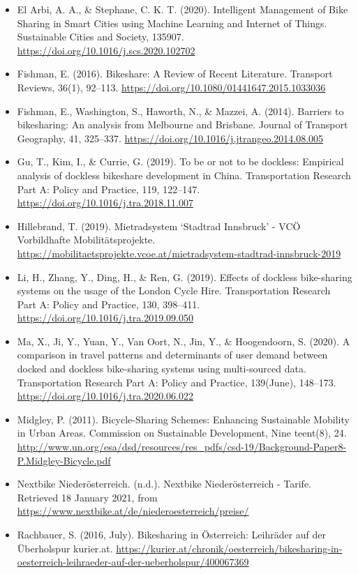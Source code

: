 \documentclass[
]{book}
\begin{document}
\begin{itemize}
\item
  El Arbi, A. A., \& Stephane, C. K. T. (2020). Intelligent Management of Bike Sharing in Smart Cities using Machine Learning and Internet of Things. Sustainable Cities and Society, 135907. \url{https://doi.org/10.1016/j.scs.2020.102702}
\item
  Fishman, E. (2016). Bikeshare: A Review of Recent Literature. Transport Reviews, 36(1), 92--113. \url{https://doi.org/10.1080/01441647.2015.1033036}
\item
  Fishman, E., Washington, S., Haworth, N., \& Mazzei, A. (2014). Barriers to bikesharing: An analysis from Melbourne and Brisbane. Journal of Transport Geography, 41, 325--337. \url{https://doi.org/10.1016/j.jtrangeo.2014.08.005}
\item
  Gu, T., Kim, I., \& Currie, G. (2019). To be or not to be dockless: Empirical analysis of dockless bikeshare development in China. Transportation Research Part A: Policy and Practice, 119, 122--147. \url{https://doi.org/10.1016/j.tra.2018.11.007}
\item
  Hillebrand, T. (2019). Mietradsystem `Stadtrad Innsbruck' - VCÖ Vorbildhafte Mobilitätsprojekte. \url{https://mobilitaetsprojekte.vcoe.at/mietradsystem-stadtrad-innsbruck-2019}
\item
  Li, H., Zhang, Y., Ding, H., \& Ren, G. (2019). Effects of dockless bike-sharing systems on the usage of the London Cycle Hire. Transportation Research Part A: Policy and Practice, 130, 398--411. \url{https://doi.org/10.1016/j.tra.2019.09.050}
\item
  Ma, X., Ji, Y., Yuan, Y., Van Oort, N., Jin, Y., \& Hoogendoorn, S. (2020). A comparison in travel patterns and determinants of user demand between docked and dockless bike-sharing systems using multi-sourced data. Transportation Research Part A: Policy and Practice, 139(June), 148--173. \url{https://doi.org/10.1016/j.tra.2020.06.022}
\item
  Midgley, P. (2011). Bicycle-Sharing Schemes: Enhancing Sustainable Mobility in Urban Areas. Commission on Sustainable Development, Nine teent(8), 24. \url{http://www.un.org/esa/dsd/resources/res_pdfs/csd-19/Background-Paper8-P.Midgley-Bicycle.pdf}
\item
  Nextbike Niederösterreich. (n.d.). Nextbike Niederösterreich - Tarife. Retrieved 18 January 2021, from \url{https://www.nextbike.at/de/niederoesterreich/preise/}
\item
  Rachbauer, S. (2016, July). Bikesharing in Österreich: Leihräder auf der Überholspur \textbar{} kurier.at. \url{https://kurier.at/chronik/oesterreich/bikesharing-in-oesterreich-leihraeder-auf-der-ueberholspur/400067369}

\end{itemize}
\end{document}
